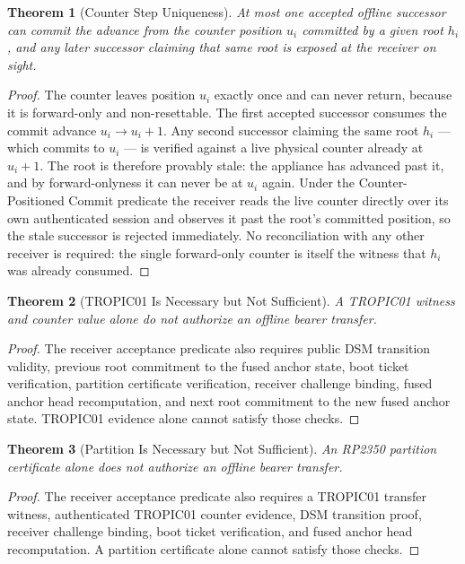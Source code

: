 \documentclass[11pt]{article}
\newtheorem{theorem}{Theorem}
\theoremstyle{definition}
\theoremstyle{remark}
\begin{document}
\begin{theorem}[Counter Step Uniqueness]
At most one accepted offline successor can commit the advance from the counter position \(u_i\)
committed by a given root \(h_i\), and any later successor claiming that same root is exposed at the
receiver on sight.
\end{theorem}

\begin{proof}
The counter leaves position \(u_i\) exactly once and can never return, because it is forward-only and
non-resettable. The first accepted successor consumes the commit advance \(u_i\to u_i+1\). Any second
successor claiming the same root \(h_i\) --- which commits to \(u_i\) --- is verified against a live
physical counter already at \(u_i+1\). The root is therefore provably stale: the appliance has advanced
past it, and by forward-onlyness it can never be at \(u_i\) again. Under the Counter-Positioned Commit
predicate the receiver reads the live counter directly over its own authenticated session and observes
it past the root's committed position, so the stale successor is rejected immediately. No reconciliation
with any other receiver is required: the single forward-only counter is itself the witness that \(h_i\)
was already consumed.
\end{proof}

\begin{theorem}[TROPIC01 Is Necessary but Not Sufficient]
A TROPIC01 witness and counter value alone do not authorize an offline bearer transfer.
\end{theorem}

\begin{proof}
The receiver acceptance predicate also requires public DSM transition validity, previous root
commitment to the fused anchor state, boot ticket verification, partition certificate verification,
receiver challenge binding, fused anchor head recomputation, and next root commitment to the new
fused anchor state. TROPIC01 evidence alone cannot satisfy those checks.
\end{proof}

\begin{theorem}[Partition Is Necessary but Not Sufficient]
An RP2350 partition certificate alone does not authorize an offline bearer transfer.
\end{theorem}

\begin{proof}
The receiver acceptance predicate also requires a TROPIC01 transfer witness, authenticated TROPIC01
counter evidence, DSM transition proof, receiver challenge binding, boot ticket verification, and
fused anchor head recomputation. A partition certificate alone cannot satisfy those checks.
\end{proof}
\end{document}
